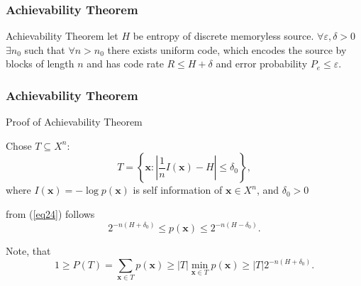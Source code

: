 \documentclass[14pt]{beamer}
\renewcommand{\vec}[1]{\ensuremath{\boldsymbol{#1}}}
\begin{document}


\begin{frame}
\frametitle{Achievability Theorem}


    \begin{theorem} {Achievability Theorem}
    let $H$ be entropy of discrete memoryless source. $\forall \varepsilon ,\delta > 0$ $\exists n_0 $ such that
    $\forall n > n_0 $ there exists uniform code, which encodes the source by blocks of length $n$ and has code rate $R \le H + \delta $ and error probability $P_e \le \varepsilon $.
    \end{theorem}

\end{frame}


\begin{frame}
\frametitle{Achievability Theorem}
Proof of Achievability Theorem
\begin{itemize}
\small{  

    \item Chose  $T \subseteq X^n$:
    \begin{equation}
    \label{eq24} T = \left\{ {\vec x:\left| {\frac{1}{n}I(\vec x) - H}
    \right| \le \delta _0 } \right\},
    \end{equation}
    where $I(\vec x) = - \log p(\vec x)$ is self information of $\vec x \in X^n$, and $\delta _0 > 0 $
    
    \item from (\ref{eq24}) follows
    \begin{equation}
    \label{eq25} 2^{ - n(H + \delta _0 )} \le p(\vec x) \le 2^{ - n(H
    - \delta _0 )}.
    \end{equation}

    \item Note, that
    \[
    1 \ge P(T) = \sum\limits_{\vec x \in T} {p(\vec x)} \ge \vert
    T\vert \mathop {\min }\limits_{\vec x \in T} p(\vec x) \ge \vert
    T\vert 2^{ - n(H + \delta _0 )}.
    \]
}
\end{itemize}
\end{frame}
\end{document}
